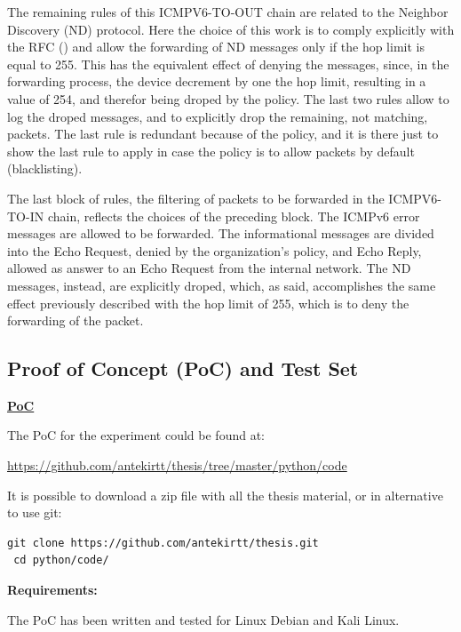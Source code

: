 \documentclass[12pt]{article}
\begin{document}
The remaining rules of this ICMPV6-TO-OUT chain are related to the Neighbor Discovery (ND) protocol. Here the choice of this work is to comply explicitly with the RFC (\cite{rfc4861}) and allow the forwarding of ND messages only if the hop limit is equal to 255. This has the equivalent effect of denying the messages, since, in the forwarding process, the device decrement by one the hop limit, resulting in a value of 254, and therefor being droped by the policy. The last two rules allow to log the droped messages, and to explicitly drop the remaining, not matching, packets. The last rule is redundant because of the policy, and it is there just to show the last rule to apply in case the policy is to allow packets by default (blacklisting).

The last block of rules, the filtering of packets to be forwarded in the ICMPV6-TO-IN chain, reflects the choices of the preceding block. The ICMPv6 error messages are allowed to be forwarded. The informational messages are divided into the Echo Request, denied by the organization's policy, and Echo Reply, allowed as answer to an Echo Request from the internal network. The ND messages, instead, are explicitly droped, which, as said, accomplishes the same effect previously described with the hop limit of 255, which is to deny the forwarding of the packet.


\subsection{Proof of Concept (PoC) and Test Set}
\label{PoCandTest}

\textbf{\underline{PoC}}

The PoC for the experiment could be found at:

\vspace{-10pt}
\url{https://github.com/antekirtt/thesis/tree/master/python/code}

It is possible to download a zip file with all the thesis material, or in alternative to use git:

\begin{lstlisting}[style=python,basicstyle=\ttfamily\footnotesize]
 git clone https://github.com/antekirtt/thesis.git
 cd python/code/
\end{lstlisting}

\vspace{-15pt}
\textbf{Requirements:}

\vspace{-10pt}
The PoC has been written and tested for Linux Debian and Kali Linux.
\end{document}
